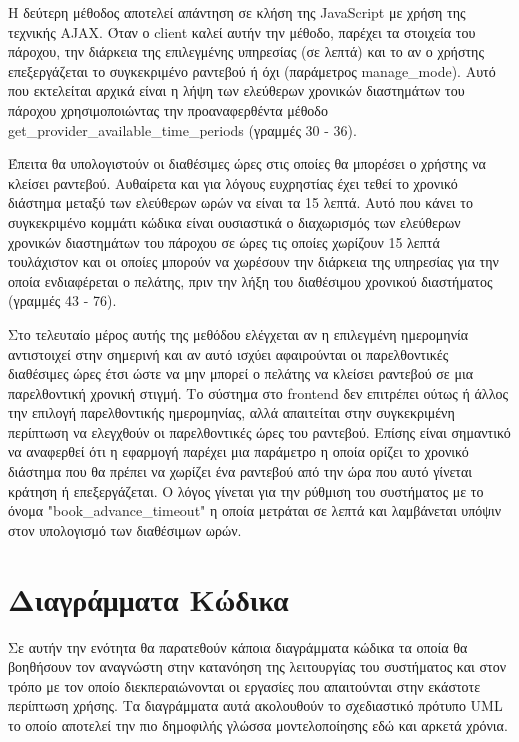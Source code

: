 

Η δεύτερη μέθοδος αποτελεί απάντηση σε κλήση της JavaScript με χρήση της τεχνικής AJAX. Όταν ο client καλεί αυτήν την μέθοδο, παρέχει τα στοιχεία του πάροχου, την διάρκεια της επιλεγμένης υπηρεσίας (σε λεπτά) και το αν ο χρήστης επεξεργάζεται το συγκεκριμένο ραντεβού ή όχι (παράμετρος manage\_mode). Αυτό που εκτελείται αρχικά είναι η λήψη των ελεύθερων χρονικών διαστημάτων του πάροχου χρησιμοποιώντας την προαναφερθέντα μέθοδο get\_provider\_available\_time\_periods (γραμμές 30 - 36). 

Έπειτα θα υπολογιστούν οι διαθέσιμες ώρες στις οποίες θα μπορέσει ο χρήστης να κλείσει ραντεβού. Αυθαίρετα και για λόγους ευχρηστίας έχει τεθεί το χρονικό διάστημα μεταξύ των ελεύθερων ωρών να είναι τα 15 λεπτά. Αυτό που κάνει το συγκεκριμένο κομμάτι κώδικα είναι ουσιαστικά ο διαχωρισμός των ελεύθερων χρονικών διαστημάτων του πάροχου σε ώρες τις οποίες χωρίζουν 15 λεπτά τουλάχιστον και οι οποίες μπορούν να χωρέσουν την διάρκεια της υπηρεσίας για την οποία ενδιαφέρεται ο πελάτης, πριν την λήξη του διαθέσιμου χρονικού διαστήματος (γραμμές 43 - 76).

Στο τελευταίο μέρος αυτής της μεθόδου ελέγχεται αν η επιλεγμένη ημερομηνία αντιστοιχεί στην σημερινή και αν αυτό ισχύει αφαιρούνται οι παρελθοντικές διαθέσιμες ώρες έτσι ώστε να μην μπορεί ο πελάτης να κλείσει ραντεβού σε μια παρελθοντική χρονική στιγμή. Το σύστημα στο frontend δεν επιτρέπει ούτως ή άλλος την επιλογή παρελθοντικής ημερομηνίας, αλλά απαιτείται στην συγκεκριμένη περίπτωση να ελεγχθούν οι παρελθοντικές ώρες του ραντεβού. Επίσης είναι σημαντικό να αναφερθεί ότι η εφαρμογή παρέχει μια παράμετρο η οποία ορίζει το χρονικό διάστημα που θα πρέπει να χωρίζει ένα ραντεβού από την ώρα που αυτό γίνεται κράτηση ή επεξεργάζεται. Ο λόγος γίνεται για την ρύθμιση του συστήματος με το όνομα "book\_advance\_timeout" η οποία μετράται σε λεπτά και λαμβάνεται υπόψιν στον υπολογισμό των διαθέσιμων ωρών.

\section{Διαγράμματα Κώδικα}
Σε αυτήν την ενότητα θα παρατεθούν κάποια διαγράμματα κώδικα τα οποία θα βοηθήσουν τον αναγνώστη στην κατανόηση της λειτουργίας του συστήματος και στον τρόπο με τον οποίο διεκπεραιώνονται οι εργασίες που απαιτούνται στην εκάστοτε περίπτωση χρήσης. Τα διαγράμματα αυτά ακολουθούν το σχεδιαστικό πρότυπο UML το οποίο αποτελεί την πιο δημοφιλής γλώσσα μοντελοποίησης εδώ και αρκετά χρόνια.

